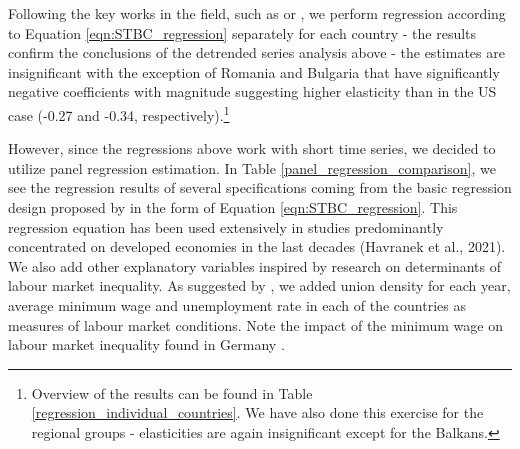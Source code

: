 \documentclass[11pt]{article}
\begin{document}
Following the key works in the field, such as \citet{katz1992changes} or \citet{acemoglu2012does}, we perform regression according to Equation \ref{eqn:STBC_regression} separately for each country - the results confirm the conclusions of the detrended series analysis above - the estimates are insignificant with the exception of Romania and Bulgaria that have significantly negative coefficients with magnitude suggesting higher elasticity than in the US case (-0.27 and -0.34, respectively).\footnote{Overview of the results can be found in Table \ref{regression_individual_countries}. We have also done this exercise for the regional groups - elasticities are again insignificant except for the Balkans.}

However, since the regressions above work with short time series, we decided to utilize panel regression estimation. In Table \ref{panel_regression_comparison}, we see the regression results of several specifications coming from the basic regression design proposed by \citet{katz1992changes} in the form of Equation \ref{eqn:STBC_regression}. This regression equation has been used extensively in studies predominantly concentrated on developed economies in the last decades (Havranek et al., 2021). We also add other explanatory variables inspired by research on determinants of labour market inequality. As suggested by \citet{farber2021unions}, we added union density for each year, average minimum wage and unemployment rate in each of the countries as measures of labour market conditions. Note the impact of the minimum wage on labour market inequality found in Germany \citep{bossler2020wage}.
\end{document}

